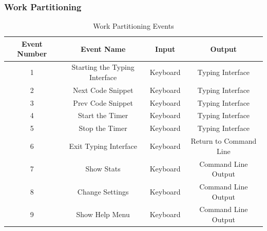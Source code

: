 \documentclass[12pt, titlepage]{article}
\begin{document}
\subsubsection{Work Partitioning}
\begin{table}[h]
    \centering
    \begin{tabular}{|c|c|c|c|}
        \hline
        Event Number & Event Name & Input & Output \\
        \hline
        1 & Starting the Typing Interface & Keyboard & Typing Interface\\
        \hline
        2 & Next Code Snippet & Keyboard & Typing Interface\\
        \hline
        3 & Prev Code Snippet & Keyboard & Typing Interface\\
        \hline
        4 & Start the Timer & Keyboard & Typing Interface\\
        \hline
        5 & Stop the Timer & Keyboard & Typing Interface\\
        \hline
        6 & Exit Typing Interface & Keyboard & Return to Command Line\\
        \hline
        7 & Show Stats & Keyboard & Command Line Output\\
        \hline
        8 & Change Settings & Keyboard & Command Line Output\\
        \hline
        9 & Show Help Menu & Keyboard & Command Line Output\\
        \hline
    \end{tabular}
    \caption{Work Partitioning Events}
    \label{tab:workpart}
\end{table}
\end{document}
